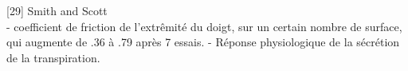 \documentclass[../main.tex]{subfiles}
\begin{document}
[29] Smith and Scott\\
- coefficient de friction de l'extr\^emit\'e du doigt, sur un certain nombre de surface, qui augmente de .36 \`a .79 apr\`es 7 essais.
- R\'eponse physiologique de la s\'ecr\'etion de la transpiration.
\end{document}

